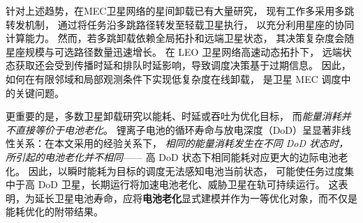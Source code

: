 \documentclass[a4paper,11pt]{article}
\begin{document}
针对上述趋势，在MEC卫星网络的星间卸载已有大量研究，
现有工作多采用多跳转发机制，
通过将任务沿多跳路径转发至轻载卫星执行，
以充分利用星座的协同计算能力\cite{zhang2024mhspo}。
然而，若多跳卸载依赖全局拓扑和远端卫星状态，
其决策复杂度会随星座规模与可选路径数量迅速增长。
在 LEO 卫星网络高速动态拓扑下，
远端状态获取还会受到传播时延和排队时延影响，导致调度决策基于过期信息。
因此，如何在有限邻域和局部观测条件下实现低复杂度在线卸载，
是卫星 MEC 调度中的关键问题\cite{chen2025gdco}。

更重要的是，多数卫星卸载研究以能耗、时延或吞吐为优化目标，
而\emph{能量消耗并不直接等价于电池老化}\cite{energyconstrained}。
锂离子电池的循环寿命与放电深度（DoD）呈显著非线性关系：在本文采用的经验关系下，
\emph{相同的能量消耗发生在不同 DoD 状态时，所引起的电池老化并不相同}——
高 DoD 状态下相同能耗对应更大的边际电池老化\cite{chen2025tasri}。
因此，以瞬时能耗为目标的调度无法感知电池当前状态，
可能使任务过度集中于高 DoD 卫星，长期运行将加速电池老化、威胁卫星在轨可持续运行\cite{li2024battery}。
这表明，为延长卫星电池寿命，应将\textbf{电池老化}显式建模并作为一等优化对象，而不仅是能耗优化的附带结果。
\end{document}
